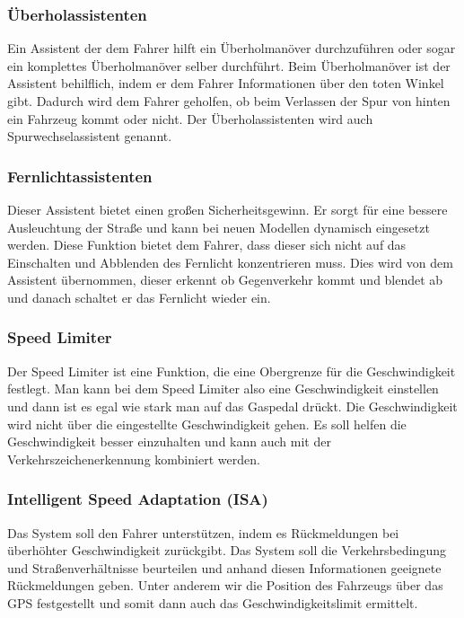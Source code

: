         \subsubsection{Überholassistenten}
        Ein Assistent der dem Fahrer hilft ein Überholmanöver durchzuführen oder sogar ein
        komplettes Überholmanöver selber durchführt. Beim Überholmanöver ist der Assistent 
        behilflich, indem er dem Fahrer Informationen über den toten Winkel gibt. Dadurch 
        wird dem Fahrer geholfen, ob beim Verlassen der Spur von hinten ein Fahrzeug kommt 
        oder nicht. Der Überholassistenten wird auch Spurwechselassistent genannt.
        ~\cite{ueberholassi.PB1} ~\cite{spurwechsel.PB1} ~\cite{assistenzsysteme.PB1} 
        ~\cite{assistenzsysteme.PB2}
        
        \subsubsection{Fernlichtassistenten}
        Dieser Assistent bietet einen großen Sicherheitsgewinn. Er sorgt für eine bessere
        Ausleuchtung der Straße und kann bei neuen Modellen dynamisch eingesetzt werden.
        Diese Funktion bietet dem Fahrer, dass dieser sich nicht auf das Einschalten und
        Abblenden des Fernlicht konzentrieren muss. Dies wird von dem Assistent übernommen,
        dieser erkennt ob Gegenverkehr kommt und blendet ab und danach schaltet er das Fernlicht
        wieder ein.
        ~\cite{assistenzsysteme.PB2} ~\cite{Audi.PB1}

        \subsubsection{Speed Limiter}
        Der Speed Limiter ist eine Funktion, die eine Obergrenze für die Geschwindigkeit festlegt.
        Man kann bei dem Speed Limiter also eine Geschwindigkeit einstellen 
        und dann ist es egal wie stark man auf das Gaspedal drückt. Die Geschwindigkeit wird nicht 
        über die eingestellte Geschwindigkeit gehen. Es soll helfen die Geschwindigkeit besser 
        einzuhalten und kann auch mit der Verkehrszeichenerkennung kombiniert werden.
        ~\cite{assistenzsysteme.PB2} ~\cite{assistenzsysteme.PB2} 

        \subsubsection{Intelligent Speed Adaptation (ISA)}
        Das System soll den Fahrer unterstützen, indem es Rückmeldungen bei überhöhter Geschwindigkeit
        zurückgibt. Das System soll die Verkehrsbedingung und Straßenverhältnisse beurteilen und
        anhand diesen Informationen geeignete Rückmeldungen geben. Unter anderem wir die Position des 
        Fahrzeugs über das GPS festgestellt und somit dann auch das Geschwindigkeitslimit ermittelt.
        ~\cite{ISA.PB1}  ~\cite{speedlimiter.PB1} ~\cite{ISA.PB2}


